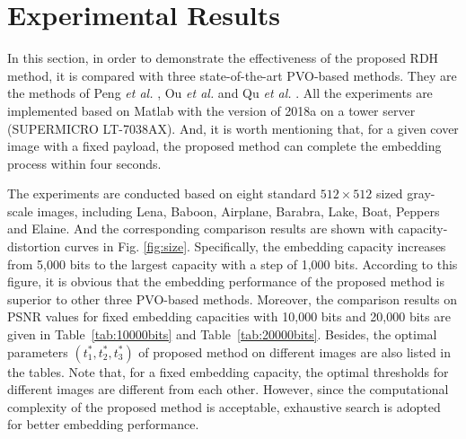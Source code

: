 \documentclass[review,3p,10pt,sort&compress]{elsarticle}
\begin{document}


\section{Experimental Results}\label{sec:4}
In this section, in order to demonstrate the effectiveness of the proposed RDH method, it is compared with three state-of-the-art PVO-based methods. They are the methods of Peng \emph{et al.} \cite{Peng2014IPVO}, Ou \emph{et al.} \cite{Ou2014PVOk} and Qu \emph{et al.} \cite{Qu2015PPVO}. All the experiments are implemented based on Matlab with the version of 2018a on a tower server (SUPERMICRO LT-7038AX). And, it is worth mentioning that, for a given cover image with a fixed payload, the proposed method can complete the embedding process within four seconds.

The experiments are conducted based on eight standard $512 \times 512$ sized gray-scale images, including Lena, Baboon, Airplane, Barabra, Lake, Boat, Peppers and Elaine. And the corresponding comparison results are shown with capacity-distortion curves in Fig. \ref{fig:size}. Specifically, the embedding capacity increases from 5,000 bits to the largest capacity with a step of 1,000 bits. According to this figure, it is obvious that the embedding performance of the proposed method is superior to other three PVO-based methods. Moreover, the comparison results on PSNR values for fixed embedding capacities with 10,000 bits and 20,000 bits are given in Table~\ref{tab:10000bits} and Table~\ref{tab:20000bits}. Besides, the optimal parameters $(t_1^*, t_2^*, t_3^*)$ of proposed method on different images are also listed in the tables. Note that, for a fixed embedding capacity, the optimal thresholds for different images are different from each other. However, since the computational complexity of the proposed method is acceptable, exhaustive search is adopted for better embedding performance.
\end{document}
